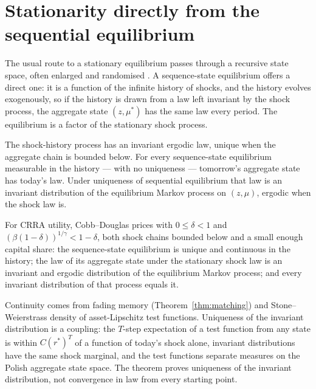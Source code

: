 \section{Stationarity directly from the sequential equilibrium}\label{sec:stationarity}

The usual route to a stationary equilibrium passes through a recursive state space, often enlarged
and randomised \citep{dgmm1994}. A sequence-state equilibrium offers a direct one: it is a function
of the infinite history of shocks, and the history evolves exogenously, so if the history is drawn
from a law left invariant by the shock process, the aggregate state $(z,\mu^*)$ has the same law
every period. The equilibrium is a factor of the stationary shock process.

\begin{theorem}\label{thm:factor}
The shock-history process has an invariant ergodic law, unique when the aggregate chain is bounded
below. For every sequence-state equilibrium measurable in the history --- with no uniqueness ---
tomorrow's aggregate state has today's law. Under uniqueness of sequential equilibrium that law is
an invariant distribution of the equilibrium Markov process on $(z,\mu)$, ergodic when the shock law
is.
\end{theorem}

\begin{theorem}\label{thm:stationary}
For CRRA utility, Cobb--Douglas prices with $0\le\delta<1$ and $(\beta(1-\delta))^{1/\gamma}<1-\delta$,
both shock chains bounded below and a small enough capital share: the sequence-state equilibrium is
unique and continuous in the history; the law of its aggregate state under the stationary shock law
is an invariant and ergodic distribution of the equilibrium Markov process; and every invariant
distribution of that process equals it.
\end{theorem}

\noindent
Continuity comes from fading memory (Theorem~\ref{thm:matching}) and Stone--Weierstrass density of
asset-Lipschitz test functions. Uniqueness of the invariant distribution is a coupling: the $T$-step
expectation of a test function from any state is within $C(r^*)^T$ of a function of today's shock
alone, invariant distributions have the same shock marginal, and the test functions separate
measures on the Polish aggregate state space. The theorem proves uniqueness of the invariant
distribution, not convergence in law from every starting point.

